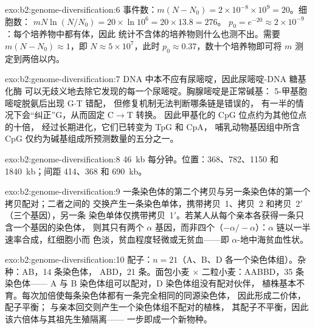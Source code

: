 \begin{solution}{exo:b2:genome-diversification:6}
事件数：$m(N - N_0) = 2\times 10^{-8}\times 10^{9} = 20$。细胞数：
$mN\ln(N/N_0) = 20\times \ln 10^{6} = 20\times 13.8 = 276$。
$p_0 = e^{-20} \approx 2\times 10^{-9}$：每个培养物中都有体，因此
统计不含体的培养物则什么也测不出。需要 $m(N -
N_0) \approx 1$，即 $N \approx 5\times 10^{7}$，此时 $p_0 \approx
0.37$，数十个培养物即可将 $m$ 测定到两倍以内。
\end{solution}

\begin{solution}{exo:b2:genome-diversification:7}
DNA 中本不应有尿嘧啶，因此尿嘧啶-DNA 糖基化酶
可以无歧义地去除它发现的每一个尿嘧啶。胸腺嘧啶是正常碱基：
5-甲基胞嘧啶脱氨后出现 G$\cdot$T 错配，
但修复机制无法判断哪条链是错误的，
有一半的情况下会“纠正”G，从而固定 C$\to$T 转换。
因此甲基化的 CpG 位点约为其他位点的十倍，
经过长期进化，它们已转变为 TpG 和 CpA，
哺乳动物基因组中所含 CpG
仅约为碱基组成所预测数量的五分之一。
\end{solution}

\begin{solution}{exo:b2:genome-diversification:8}
\qty{46}{kb} 每分钟。位置：368、782、1150 和
\qty{1840}{kb}；间距 414、368 和 \qty{690}{kb}。
\end{solution}

\begin{solution}{exo:b2:genome-diversification:9}
一条染色体的第二个拷贝与另一条染色体的第一个拷贝配对；二者之间的
交换产生一条染色单体，携带拷贝~1、拷贝~2 和拷贝~2$'$（三个基因），另一条
染色单体仅携带拷贝~1$'$。若某人从每个亲本各获得一条只含一个基因的染色体，
则其只有两个 $\alpha$ 基因，而非四个（$-\alpha/-\alpha$）：$\alpha$
链以一半速率合成，红细胞小而
色淡，贫血程度轻微或无贫血——即
$\alpha$-地中海贫血性状。
\end{solution}

\begin{solution}{exo:b2:genome-diversification:10}
配子：$n = 21$（A、B、D 各一个染色体组）。杂种：AB，14 条染色体，
ABD，21 条。面包小麦 $\times$ 二粒小麦：AABBD，35 条染色体——
A 与 B 染色体组可以配对，D 染色体组没有配对伙伴，
植株基本不育。每次加倍使每条染色体都有一条完全相同的同源染色体，
因此形成二价体，配子平衡；
与亲本回交则产生一个染色体组不配对的植株，
其配子不平衡，因此该六倍体与其祖先生殖隔离——
一步即成一个新物种。
\end{solution}


